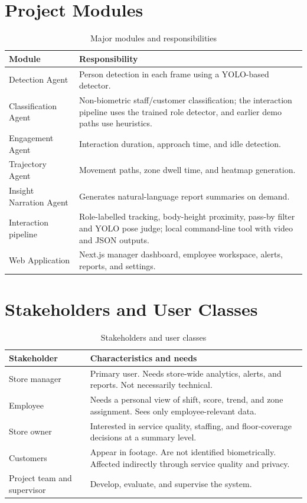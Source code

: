 \section{Project Modules}
\begin{table}[H]
\centering
\caption{Major modules and responsibilities}
\begin{tabular}{P{0.25\textwidth}P{0.65\textwidth}}
\toprule
Module & Responsibility\\
\midrule
Detection Agent & Person detection in each frame using a YOLO-based detector.\\
Classification Agent & Non-biometric staff/customer classification; the interaction pipeline uses the trained role detector, and earlier demo paths use heuristics.\\
Engagement Agent & Interaction duration, approach time, and idle detection.\\
Trajectory Agent & Movement paths, zone dwell time, and heatmap generation.\\
Insight Narration Agent & Generates natural-language report summaries on demand.\\
Interaction pipeline & Role-labelled tracking, body-height proximity, pass-by filter and YOLO pose judge; local command-line tool with video and JSON outputs.\\
Web Application & Next.js manager dashboard, employee workspace, alerts, reports, and settings.\\
\bottomrule
\end{tabular}
\end{table}

\section{Stakeholders and User Classes}
\begin{table}[H]
\centering
\caption{Stakeholders and user classes}
\begin{tabular}{P{0.2\textwidth}P{0.7\textwidth}}
\toprule
Stakeholder & Characteristics and needs\\
\midrule
Store manager & Primary user. Needs store-wide analytics, alerts, and reports. Not necessarily technical.\\
Employee & Needs a personal view of shift, score, trend, and zone assignment. Sees only employee-relevant data.\\
Store owner & Interested in service quality, staffing, and floor-coverage decisions at a summary level.\\
Customers & Appear in footage. Are not identified biometrically. Affected indirectly through service quality and privacy.\\
Project team and supervisor & Develop, evaluate, and supervise the system.\\
\bottomrule
\end{tabular}
\end{table}

